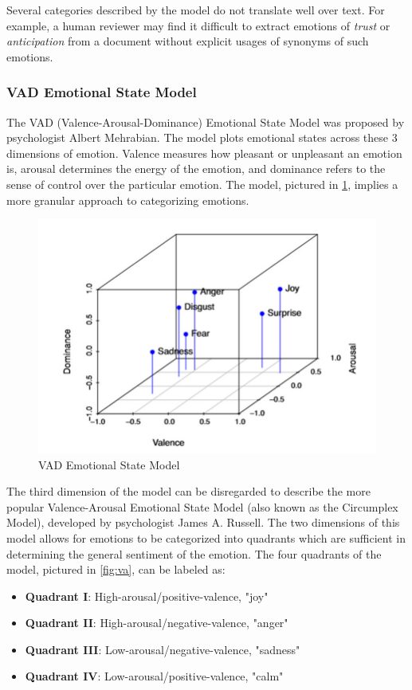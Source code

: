 \documentclass[11pt]{article}
\begin{document}
Several categories described by the model do not translate well over text. For example, a human reviewer may find it difficult to extract emotions of \textit{trust} or \textit{anticipation} from a document without explicit usages of synonyms of such emotions.

\subsubsection{VAD Emotional State Model}

The VAD (Valence-Arousal-Dominance) Emotional State Model was proposed by psychologist Albert Mehrabian. The model plots emotional states across these 3 dimensions of emotion. Valence measures how pleasant or unpleasant an emotion is, arousal determines the energy of the emotion, and dominance refers to the sense of control over the particular emotion. The model, pictured in \ref{fig:vad}, implies a more granular approach to categorizing emotions.

\begin{figure}[!ht]
  \includegraphics[scale=0.35]{../statics/vad_.png}
  \centering
  \caption{VAD Emotional State Model}
  \label{fig:vad}
\end{figure}

The third dimension of the model can be disregarded to describe the more popular Valence-Arousal Emotional State Model (also known as the Circumplex Model), developed by psychologist James A. Russell. The two dimensions of this model allows for emotions to be categorized into quadrants which are sufficient in determining the general sentiment of the emotion. The four quadrants of the model, pictured in \ref{fig:va}, can be labeled as:
\begin{itemize}
  \item \textbf{Quadrant I}: High-arousal/positive-valence, "joy"
  \item \textbf{Quadrant II}: High-arousal/negative-valence, "anger"
  \item \textbf{Quadrant III}: Low-arousal/negative-valence, "sadness"
  \item \textbf{Quadrant IV}: Low-arousal/positive-valence, "calm"
\end{itemize}
\end{document}
